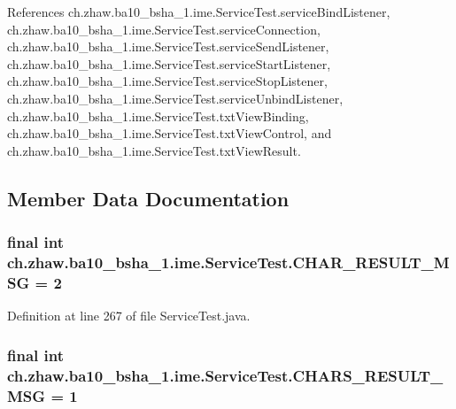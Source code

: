 References ch.zhaw.ba10\_\-bsha\_\-1.ime.ServiceTest.serviceBindListener, ch.zhaw.ba10\_\-bsha\_\-1.ime.ServiceTest.serviceConnection, ch.zhaw.ba10\_\-bsha\_\-1.ime.ServiceTest.serviceSendListener, ch.zhaw.ba10\_\-bsha\_\-1.ime.ServiceTest.serviceStartListener, ch.zhaw.ba10\_\-bsha\_\-1.ime.ServiceTest.serviceStopListener, ch.zhaw.ba10\_\-bsha\_\-1.ime.ServiceTest.serviceUnbindListener, ch.zhaw.ba10\_\-bsha\_\-1.ime.ServiceTest.txtViewBinding, ch.zhaw.ba10\_\-bsha\_\-1.ime.ServiceTest.txtViewControl, and ch.zhaw.ba10\_\-bsha\_\-1.ime.ServiceTest.txtViewResult.

\subsection{Member Data Documentation}
\hypertarget{classch_1_1zhaw_1_1ba10__bsha__1_1_1ime_1_1ServiceTest_af5742511ec4008834a2d1354102ce616}{
\subsubsection[{CHAR\_\-RESULT\_\-MSG}]{\setlength{\rightskip}{0pt plus 5cm}final int {\bf ch.zhaw.ba10\_\-bsha\_\-1.ime.ServiceTest.CHAR\_\-RESULT\_\-MSG} = 2}}
\label{classch_1_1zhaw_1_1ba10__bsha__1_1_1ime_1_1ServiceTest_af5742511ec4008834a2d1354102ce616}


Definition at line 267 of file ServiceTest.java.\hypertarget{classch_1_1zhaw_1_1ba10__bsha__1_1_1ime_1_1ServiceTest_ac1d59d2fe1c01777f19b3c9bdf279f4f}{
\subsubsection[{CHARS\_\-RESULT\_\-MSG}]{\setlength{\rightskip}{0pt plus 5cm}final int {\bf ch.zhaw.ba10\_\-bsha\_\-1.ime.ServiceTest.CHARS\_\-RESULT\_\-MSG} = 1}}
\label{classch_1_1zhaw_1_1ba10__bsha__1_1_1ime_1_1ServiceTest_ac1d59d2fe1c01777f19b3c9bdf279f4f}


